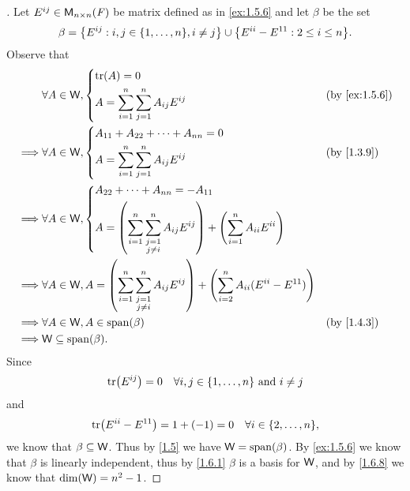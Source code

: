 \begin{proof}[]
  Let \(E^{i j} \in \mathsf{M}_{{n} \times n}({\mathit{F}})\) be matrix defined as in \cref{ex:1.5.6} and let \(\beta\) be the set
  \[
    \beta = \set{E^{i j} : i, j \in \set{1, \dots, n}, i \neq j} \cup \set{E^{i i} - E^{1 1} : 2 \leq i \leq n}.
  \]
  Observe that
  \begin{align*}
             & \forall A \in \W, \begin{dcases}
      \tr{A} = 0 \\
      A = \sum_{i = 1}^n \sum_{j = 1}^n A_{i j} E^{i j}
    \end{dcases}                   &  & \text{(by \cref{ex:1.5.6})} \\
    \implies & \forall A \in \W, \begin{dcases}
      A_{1 1} + A_{2 2} + \cdots + A_{n n} = 0 \\
      A = \sum_{i = 1}^n \sum_{j = 1}^n A_{i j} E^{i j}
    \end{dcases}                   &  & \text{(by \cref{1.3.9})}    \\
    \implies & \forall A \in \W, \begin{dcases}
      A_{2 2} + \cdots + A_{n n} = -A_{1 1}        \\
      A = \pa{\sum_{i = 1}^n \sum_{\substack{j = 1 \\ j \neq i}}^n A_{i j} E^{i j}} + \pa{\sum_{i = 1}^n A_{i i} E^{i i}}
    \end{dcases}                                                    \\
    \implies & \forall A \in \W, A = \pa{\sum_{i = 1}^n \sum_{\substack{j = 1                                  \\ j \neq i}}^n A_{i j} E^{i j}} + \pa{\sum_{i = 2}^n A_{i i} (E^{i i} - E^{1 1})} \\
    \implies & \forall A \in \W, A \in \spn{\beta}                            &  & \text{(by \cref{1.4.3})}    \\
    \implies & \W \subseteq \spn{\beta}.
  \end{align*}
  Since
  \[
    \tr{E^{i j}} = 0 \quad \forall i, j \in \set{1, \dots, n} \text{ and } i \neq j
  \]
  and
  \[
    \tr{E^{i i} - E^{1 1}} = 1 + (-1) = 0 \quad \forall i \in \set{2, \dots, n},
  \]
  we know that \(\beta \subseteq \mathsf{W}\).
  Thus by \cref{1.5} we have \(\W = \spn{\beta}\).
  By \cref{ex:1.5.6} we know that \(\beta\) is linearly independent, thus by \cref{1.6.1} \(\beta\) is a basis for \(\mathsf{W}\), and by \cref{1.6.8} we know that \(\dim(\mathsf{W}) = n^2 - 1\).
\end{proof}

